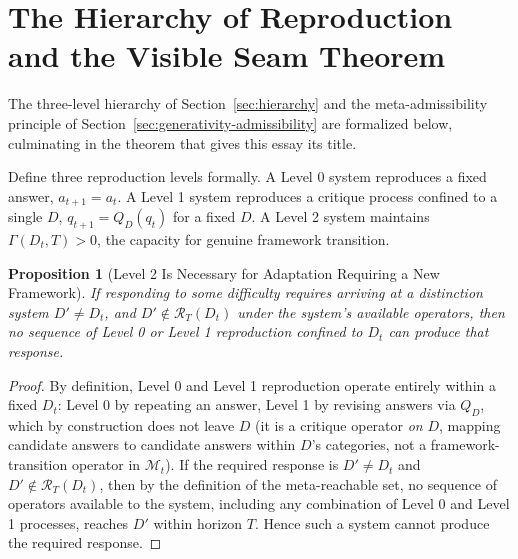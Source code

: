 \documentclass[11pt]{article}
\theoremstyle{plain}
\newtheorem{proposition}{Proposition}[section]
\begin{document}
\section{The Hierarchy of Reproduction and the Visible Seam Theorem}
\label{app:hierarchy-theorem}

\noindent The three-level hierarchy of Section~\ref{sec:hierarchy} and the meta-admissibility principle of Section~\ref{sec:generativity-admissibility} are formalized below, culminating in the theorem that gives this essay its title.

Define three reproduction levels formally. A Level 0 system reproduces a fixed answer, $a_{t+1} = a_t$. A Level 1 system reproduces a critique process confined to a single $D$, $q_{t+1} = Q_D(q_t)$ for a fixed $D$. A Level 2 system maintains $\Gamma(D_t,T) > 0$, the capacity for genuine framework transition.

\begin{proposition}[Level 2 Is Necessary for Adaptation Requiring a New Framework]
If responding to some difficulty requires arriving at a distinction system $D' \neq D_t$, and $D' \notin \mathcal{R}_T(D_t)$ under the system's available operators, then no sequence of Level 0 or Level 1 reproduction confined to $D_t$ can produce that response.
\end{proposition}
\begin{proof}
By definition, Level 0 and Level 1 reproduction operate entirely within a fixed $D_t$: Level 0 by repeating an answer, Level 1 by revising answers via $Q_D$, which by construction does not leave $D$ (it is a critique operator \emph{on} $D$, mapping candidate answers to candidate answers within $D$'s categories, not a framework-transition operator in $\mathcal{M}_t$). If the required response is $D' \neq D_t$ and $D' \notin \mathcal{R}_T(D_t)$, then by the definition of the meta-reachable set, no sequence of operators available to the system, including any combination of Level 0 and Level 1 processes, reaches $D'$ within horizon $T$. Hence such a system cannot produce the required response.
\end{proof}
\end{document}
